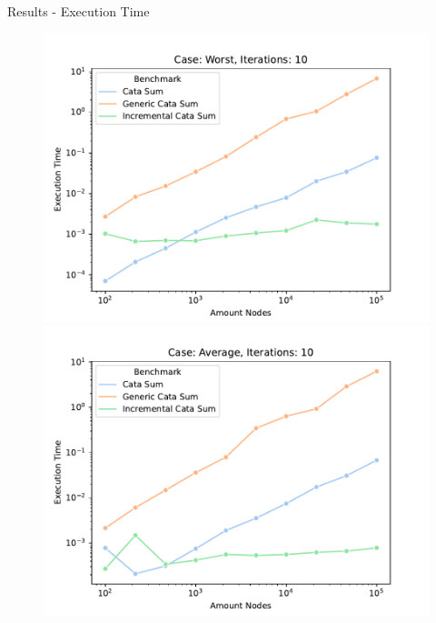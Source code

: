 \begin{slide}{Results - Execution Time}
  \begin{figure}[H]
    \begin{minipage}{.32\textwidth}
      \centering
      \includegraphics[width=\textwidth]{images/time/Worst/10/all_benchmarks.pdf}
    \end{minipage}
    \begin{minipage}{.32\textwidth}
      \centering
      \includegraphics[width=\textwidth]{images/time/Average/10/all_benchmarks.pdf}  
    \end{minipage}
    \begin{minipage}{.32\textwidth}
      \centering

\end{minipage}
\end{figure}
\end{slide}
